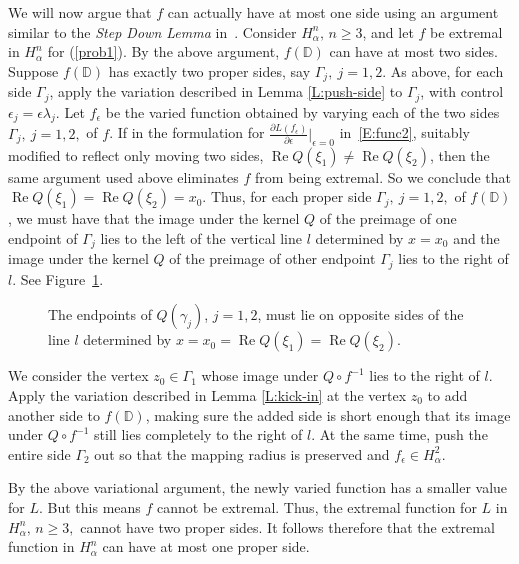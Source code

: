 \documentclass{cmft}
\newcommand{\D}{\mathbb{D}}
\newcommand{\e}{\epsilon}
\newcommand{\al}{\alpha}
\DeclareMathOperator{\re}{Re}
\begin{document}
We will now
argue that $f$ can actually have at most one side using an argument 
similar to the 
\emph{Step Down Lemma} in~\cite{bcpw}.  
Consider $H_{\al}^n,\, n \ge 3$, and let $f$ be
extremal in $H_{\al}^n$ for (\ref{prob1}).  By the above argument, $f(\D)$ can
have at most two sides.  Suppose $f(\D)$ has exactly two proper sides, say
$\Gamma_j, \ j=1,2$. As above, for each side $\Gamma_j$, apply the variation
described in Lemma \ref{L:push-side} to $\Gamma_j$, with control $\e_j = \e
\lambda_j$.  Let $f_{\e}$ be the varied function obtained by varying each of the
two sides $\Gamma_j, \ j= 1,2,$ of $f$.  If in the formulation for
$\frac{\partial L(f_{\e})} {\partial \e} \big\vert_{\e = 0}$ in~\eqref{E:func2}, 
suitably modified to
reflect only moving two sides, $\re Q(\xi_1) \ne \re Q(\xi_2)$, then the same
argument used above
eliminates $f$ from being extremal.  So we conclude that $\re
Q(\xi_1) = \re Q(\xi_2)= x_0$.  Thus, for each proper side $\Gamma_j, \ j=1,2,$
of $f(\D)$, we must have that the image under the kernel $Q$ of the preimage of
one endpoint of $\Gamma_j$ lies to the left of the vertical line $l$ 
determined by $x=x_0$ and the image under the
kernel $Q$ of the preimage of other endpoint $\Gamma_j$ lies to 
the right of $l$. See Figure~\ref{F:kick-right}.


\begin{figure}
\begin{center}
\caption{The endpoints of $Q(\gamma_j)$, $j=1,2$, must lie on opposite sides of the
  line $l$ determined by $x=x_0=\re Q(\xi_1)=\re Q(\xi_2)$.}
\label{F:kick-right}
\end{center}
\end{figure}

We consider the 
 vertex $z_0\in\Gamma_1$ whose image under $Q\circ f^{-1}$ lies to the right of
$l$. Apply the variation described in Lemma \ref{L:kick-in} at the vertex
$z_0$ to add another side to $f(\D)$, making sure the added side is 
short enough that its image under $Q\circ f^{-1}$ 
still lies completely to the right of $l$.  
At the same time, push the entire side $\Gamma_2$ out so that the mapping
radius is preserved and $f_\epsilon\in H_\al^2$.

By the above variational
argument, the newly varied function has a smaller value for $L$.  But this means
$f$ cannot be extremal.  Thus, the extremal function for $L$ in $H_{\al}^n,\,
n\geq 3,$ cannot have two proper sides.  It follows therefore that the extremal
function in $H_{\al}^n$ can have at most one proper side.
\end{document}
